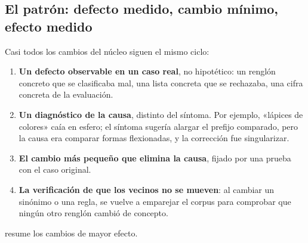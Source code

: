 \subsection{El patrón: defecto medido, cambio mínimo, efecto medido}

Casi todos los cambios del núcleo siguen el mismo ciclo:
\begin{enumerate}
  \item \textbf{Un defecto observable en un caso real}, no hipotético: un
        renglón concreto que se clasificaba mal, una lista concreta que se
        rechazaba, una cifra concreta de la evaluación.
  \item \textbf{Un diagnóstico de la causa}, distinto del síntoma. Por
        ejemplo, «lápices de colores» caía en esfero; el síntoma sugería
        alargar el prefijo comparado, pero la causa era comparar formas
        flexionadas, y la corrección fue singularizar.
  \item \textbf{El cambio más pequeño que elimina la causa}, fijado por una
        prueba con el caso original.
  \item \textbf{La verificación de que los vecinos no se mueven}: al cambiar
        un sinónimo o una regla, se vuelve a emparejar el corpus para comprobar
        que ningún otro renglón cambió de concepto.
\end{enumerate}

 resume los cambios de mayor efecto.

